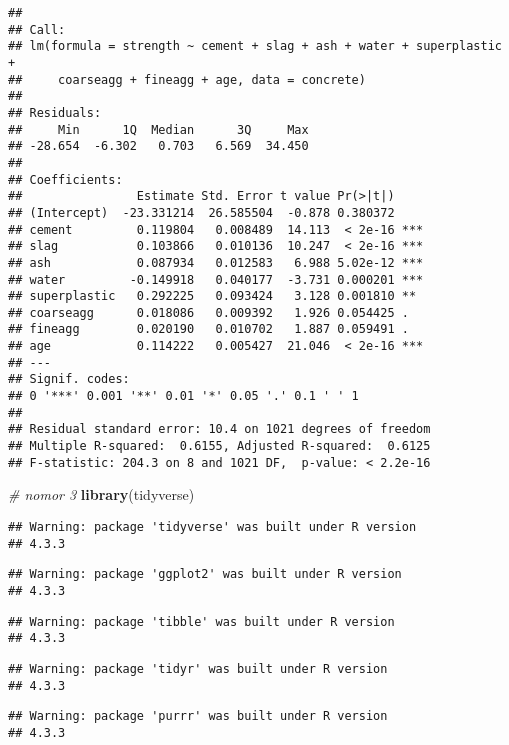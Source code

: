 \documentclass[
]{article}
\newenvironment{Shaded}{\begin{snugshade}}{\end{snugshade}}
\newcommand{\CommentTok}[1]{\textcolor[rgb]{0.56,0.35,0.01}{\textit{#1}}}
\newcommand{\FunctionTok}[1]{\textcolor[rgb]{0.13,0.29,0.53}{\textbf{#1}}}
\newcommand{\NormalTok}[1]{#1}
\begin{document}
\begin{verbatim}
## 
## Call:
## lm(formula = strength ~ cement + slag + ash + water + superplastic + 
##     coarseagg + fineagg + age, data = concrete)
## 
## Residuals:
##     Min      1Q  Median      3Q     Max 
## -28.654  -6.302   0.703   6.569  34.450 
## 
## Coefficients:
##                Estimate Std. Error t value Pr(>|t|)    
## (Intercept)  -23.331214  26.585504  -0.878 0.380372    
## cement         0.119804   0.008489  14.113  < 2e-16 ***
## slag           0.103866   0.010136  10.247  < 2e-16 ***
## ash            0.087934   0.012583   6.988 5.02e-12 ***
## water         -0.149918   0.040177  -3.731 0.000201 ***
## superplastic   0.292225   0.093424   3.128 0.001810 ** 
## coarseagg      0.018086   0.009392   1.926 0.054425 .  
## fineagg        0.020190   0.010702   1.887 0.059491 .  
## age            0.114222   0.005427  21.046  < 2e-16 ***
## ---
## Signif. codes:  
## 0 '***' 0.001 '**' 0.01 '*' 0.05 '.' 0.1 ' ' 1
## 
## Residual standard error: 10.4 on 1021 degrees of freedom
## Multiple R-squared:  0.6155, Adjusted R-squared:  0.6125 
## F-statistic: 204.3 on 8 and 1021 DF,  p-value: < 2.2e-16
\end{verbatim}

\begin{Shaded}
\begin{Highlighting}[]
\CommentTok{\# nomor 3}
\FunctionTok{library}\NormalTok{(tidyverse)}
\end{Highlighting}
\end{Shaded}

\begin{verbatim}
## Warning: package 'tidyverse' was built under R version
## 4.3.3
\end{verbatim}

\begin{verbatim}
## Warning: package 'ggplot2' was built under R version
## 4.3.3
\end{verbatim}

\begin{verbatim}
## Warning: package 'tibble' was built under R version
## 4.3.3
\end{verbatim}

\begin{verbatim}
## Warning: package 'tidyr' was built under R version
## 4.3.3
\end{verbatim}

\begin{verbatim}
## Warning: package 'purrr' was built under R version
## 4.3.3
\end{verbatim}
\end{document}
